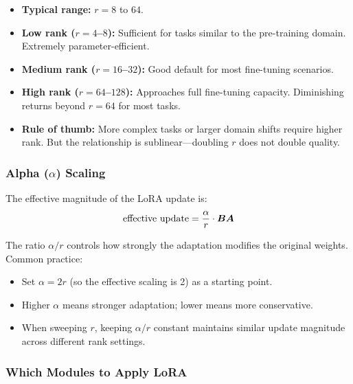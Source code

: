 \begin{itemize}
    \item \textbf{Typical range:} $r = 8$ to $64$.
    \item \textbf{Low rank ($r = 4$--$8$):} Sufficient for tasks similar to the
          pre-training domain.  Extremely parameter-efficient.
    \item \textbf{Medium rank ($r = 16$--$32$):} Good default for most
          fine-tuning scenarios.
    \item \textbf{High rank ($r = 64$--$128$):} Approaches full fine-tuning
          capacity.  Diminishing returns beyond $r = 64$ for most tasks.
    \item \textbf{Rule of thumb:} More complex tasks or larger domain shifts
          require higher rank.  But the relationship is sublinear---doubling
          $r$ does not double quality.
\end{itemize}

\subsubsection{Alpha ($\alpha$) Scaling}

The effective magnitude of the LoRA update is:
\[
    \text{effective update} = \frac{\alpha}{r} \cdot \bm{B}\bm{A}
\]

The ratio $\alpha/r$ controls how strongly the adaptation modifies the original
weights.  Common practice:
\begin{itemize}
    \item Set $\alpha = 2r$ (so the effective scaling is 2) as a starting point.
    \item Higher $\alpha$ means stronger adaptation; lower means more conservative.
    \item When sweeping $r$, keeping $\alpha/r$ constant maintains similar
          update magnitude across different rank settings.
\end{itemize}

\subsubsection{Which Modules to Apply LoRA}

